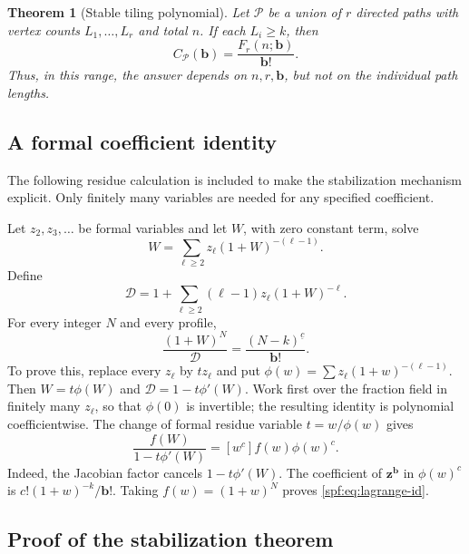 \documentclass[11pt]{article}
\numberwithin{equation}{section}
\newtheorem{theorem}{Theorem}[section]
\theoremstyle{definition}
\theoremstyle{remark}
\theoremstyle{definition}
\newcommand{\fall}[2]{{#1}^{\underline{#2}}}
\newcommand{\bfac}{\mathbf b!}
\begin{document}
\begin{theorem}[Stable tiling polynomial]
\label{spf:thm:stable}
Let $\mathcal P$ be a union of $r$ directed paths with vertex counts
$L_1,\ldots,L_r$ and total $n$. If each $L_i\ge k$, then
\begin{equation}
 C_{\mathcal P}(\mathbf b)=\frac{F_r(n;\mathbf b)}{\bfac}.
 \label{spf:eq:stable-C}
\end{equation}
Thus, in this range, the answer depends on $n,r,\mathbf b$, but not on the
individual path lengths.
\end{theorem}

\subsection{A formal coefficient identity}

The following residue calculation is included to make the stabilization
mechanism explicit. Only finitely many variables are needed for any specified
coefficient.

Let $z_2,z_3,\ldots$ be formal variables and let $W$, with zero constant term,
solve
\begin{equation}
 W=\sum_{\ell\ge2}z_\ell(1+W)^{-(\ell-1)}.
\end{equation}
Define
\begin{equation}
 \mathcal D=1+\sum_{\ell\ge2}(\ell-1)z_\ell(1+W)^{-\ell}.
\end{equation}
For every integer $N$ and every profile,
\begin{equation}
 [\mathbf z^{\mathbf b}]\frac{(1+W)^N}{\mathcal D}
     =\frac{\fall{(N-k)}c}{\bfac}.
 \label{spf:eq:lagrange-id}
\end{equation}
To prove this, replace every $z_\ell$ by $t z_\ell$ and put
$\phi(w)=\sum z_\ell(1+w)^{-(\ell-1)}$. Then $W=t\phi(W)$ and
$\mathcal D=1-t\phi'(W)$. Work first over the fraction field in finitely many $z_\ell$, so that
$\phi(0)$ is invertible; the resulting identity is polynomial coefficientwise.
The change of formal residue variable $t=w/\phi(w)$ gives
\begin{equation}
 [t^c]\frac{f(W)}{1-t\phi'(W)}=[w^c]f(w)\phi(w)^c.
\end{equation}
Indeed, the Jacobian factor cancels $1-t\phi'(W)$. The coefficient of
$\mathbf z^{\mathbf b}$ in $\phi(w)^c$ is
$c!(1+w)^{-k}/\bfac$. Taking $f(w)=(1+w)^N$ proves
\eqref{spf:eq:lagrange-id}.

\subsection{Proof of the stabilization theorem}
\end{document}
